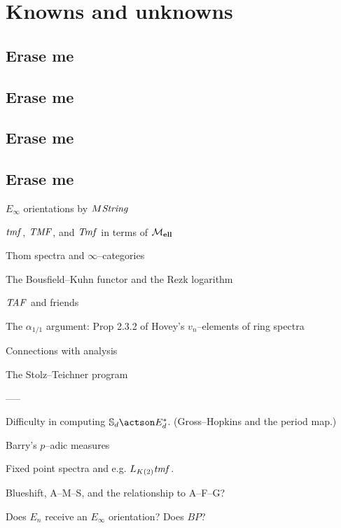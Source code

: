 
\chapter{Knowns and unknowns}

\section{Erase me}

\section{Erase me}

\section{Erase me}

\section{Erase me}


$E_\infty$ orientations by $M\mathit{String}$

$\mathit{tmf}$, $\mathit{TMF}$, and $\mathit{Tmf}$ in terms of $\mathcal{M}_{\mathbf{ell}}$

Thom spectra and $\infty$--categories

The Bousfield--Kuhn functor and the Rezk logarithm



$\mathit{TAF}$ and friends

The $\alpha_{1/1}$ argument: Prop 2.3.2 of Hovey's $v_n$--elements of ring spectra




Connections with analysis

The Stolz--Teichner program







-----

Difficulty in computing $\S_d \actson E_d^*$. (Gross--Hopkins and the period map.)

Barry's $p$--adic measures

Fixed point spectra and e.g. $L_{K(2)} \mathit{tmf}$.

Blueshift, A--M--S, and the relationship to A--F--G?

Does $E_n$ receive an $E_\infty$ orientation?  Does $BP$?

